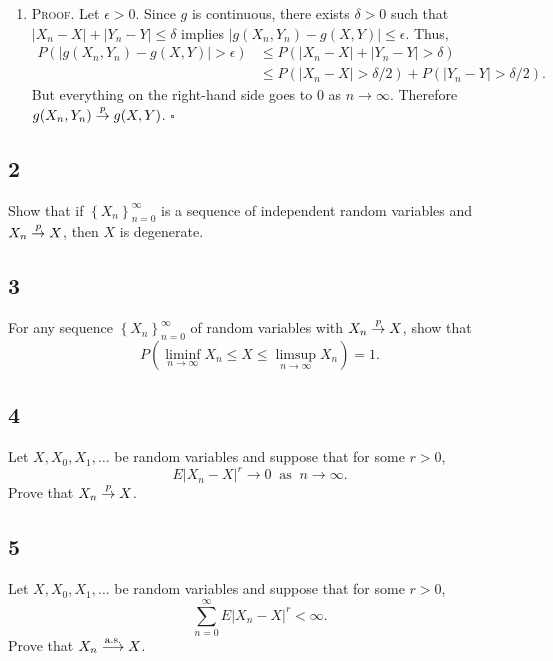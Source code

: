 \documentclass[12pt]{article}
\newcounter{ProofCounter}
\newenvironment{Proof}{\stepcounter{ProofCounter}\textsc{Proof.}}{\hfill$\square$}
\begin{document}
\begin{enumerate}[label=(\alph*)]
\item \begin{Proof}
Let $\epsilon > 0$. Since $g$ is continuous, there exists $\delta > 0$ such that $|X_{n} - X| + |Y_{n} - Y| \leq \delta$ implies $|g(X_{n},Y_{n}) -
g(X,Y)| \leq \epsilon$. Thus,
\begin{align*}
P(|g(X_{n},Y_{n}) - g(X,Y)| > \epsilon) & \leq P(|X_{n} - X| + |Y_{n} - Y| > \delta) \\
& \leq P(|X_{n} - X| > \delta/2) + P(|Y_{n} - Y|>\delta/2).
\end{align*}
But everything on the right-hand side goes to 0 as $n\rightarrow\infty$. Therefore $g(X_{n},Y_{n}) \stackrel{p}{\rightarrow} g(X,Y)$. 
\end{Proof}
\end{enumerate}

\subsection*{2}
\begin{tcolorbox}
Show that if $\left\{ X_{n} \right\}_{n=0}^{\infty}$ is a sequence of independent random variables and $X_{n} \stackrel{p}{\rightarrow} X$, then $X$ is degenerate.
\end{tcolorbox}

\subsection*{3}
\begin{tcolorbox}
For any sequence $\left\{ X_{n} \right\}_{n=0}^{\infty}$ of random variables with $X_{n}\stackrel{p}{\rightarrow} X$, show that 
\[ P(\liminf_{n\rightarrow\infty}X_{n}\leq X\leq \limsup_{n\rightarrow\infty}X_{n}) = 1. \]
\end{tcolorbox}

\subsection*{4}
\begin{tcolorbox}
Let $X, X_{0}, X_{1}, \hdots$ be random variables and suppose that for some $r > 0$,
\[ E|X_{n} - X|^{r} \rightarrow 0 \ \text{ as } \ n \rightarrow \infty. \]
Prove that $X_{n}\stackrel{p}{\rightarrow} X$.
\end{tcolorbox}

\subsection*{5}
\begin{tcolorbox}
Let $X, X_{0}, X_{1}, \hdots$ be random variables and suppose that for some $r > 0$,
\[ \sum_{n=0}^{\infty}E|X_{n} - X|^{r} < \infty. \]
Prove that $X_{n} \stackrel{\text{a.s.}}{\longrightarrow} X$.
\end{tcolorbox}
\end{document}

